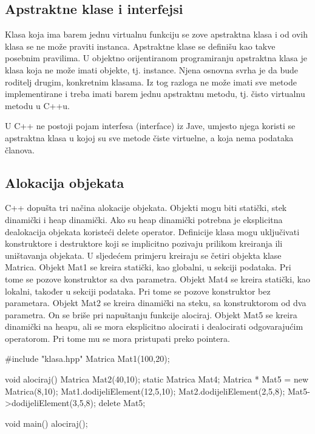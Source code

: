 \documentclass[11pt]{book}
\begin{document}
\subsection{Apstraktne klase i interfejsi}
Klasa koja ima barem jednu virtualnu funkciju se zove apstraktna klasa i od ovih klasa se ne može praviti instanca. Apstraktne  klase  se  definišu  kao  takve  posebnim  pravilima.  U objektno  orijentiranom programiranju apstraktna  klasa je   klasa koja  ne  može  imati objekte,  tj.  instance.  Njena osnovna svrha je da bude roditelj drugim, konkretnim klasama. Iz tog razloga ne može imati sve metode implementirane i treba imati barem jednu apstraktnu metodu, tj. čisto virtualnu metodu u C++u.

U C++ ne postoji pojam interfesa (interface) iz Jave, umjesto njega koristi se apstraktna klasa u kojoj su sve metode čiste virtuelne, a koja nema podataka članova.



\subsection{Alokacija objekata}

C++ dopušta tri načina alokacije objekata. Objekti  mogu  biti  statički,  stek  dinamički  i  heap  dinamički. Ako su heap dinamički potrebna je eksplicitna dealokacija objekata koristeći delete operator. Definicije klasa mogu uključivati konstruktore i destruktore koji se implicitno pozivaju prilikom kreiranja ili uništavanja objekata. U sljedećem primjeru kreiraju se četiri objekta klase Matrica. Objekt Mat1 se kreira statički, kao globalni,  u sekciji podataka. Pri tome se pozove konstruktor sa dva parametra. Objekt Mat4 se kreira statički, kao lokalni, također u sekciji podataka. Pri tome se pozove konstruktor bez parametara. Objekt Mat2 se kreira dinamički na steku, sa konstruktorom od dva parametra. On se briše pri napuštanju funkcije alociraj. Objekt Mat5 se kreira dinamički na heapu, ali se mora eksplicitno alocirati i dealocirati odgovarajućim operatorom. Pri tome mu se mora pristupati preko pointera.

\begin{shortlisting}
  #include "klasa.hpp"
  Matrica Mat1(100,20);

  void alociraj() {
      Matrica Mat2(40,10);
      static Matrica Mat4;
      Matrica * Mat5 = new Matrica(8,10);
      Mat1.dodijeliElement(12,5,10);
      Mat2.dodijeliElement(2,5,8);
      Mat5->dodijeliElement(3,5,8);
      delete Mat5;
    }

  void main() {
      alociraj();
    }
\end{shortlisting}
\end{document}
